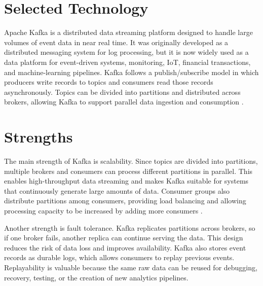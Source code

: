 \documentclass[10pt,a4paper,twocolumn]{article}
\begin{document}

\section{Selected Technology}

Apache Kafka is a distributed data streaming platform designed to handle large volumes of event data in near real time. It was originally developed as a distributed messaging system for log processing, but it is now widely used as a data platform for event-driven systems, monitoring, IoT, financial transactions, and machine-learning pipelines. Kafka follows a publish/subscribe model in which producers write records to topics and consumers read those records asynchronously. Topics can be divided into partitions and distributed across brokers, allowing Kafka to support parallel data ingestion and consumption \cite{kreps2011kafka,raptis2023survey}.

\section{Strengths}

The main strength of Kafka is scalability. Since topics are divided into partitions, multiple brokers and consumers can process different partitions in parallel. This enables high-throughput data streaming and makes Kafka suitable for systems that continuously generate large amounts of data. Consumer groups also distribute partitions among consumers, providing load balancing and allowing processing capacity to be increased by adding more consumers \cite{raptis2023survey}.

Another strength is fault tolerance. Kafka replicates partitions across brokers, so if one broker fails, another replica can continue serving the data. This design reduces the risk of data loss and improves availability. Kafka also stores event records as durable logs, which allows consumers to replay previous events. Replayability is valuable because the same raw data can be reused for debugging, recovery, testing, or the creation of new analytics pipelines.
\end{document}
